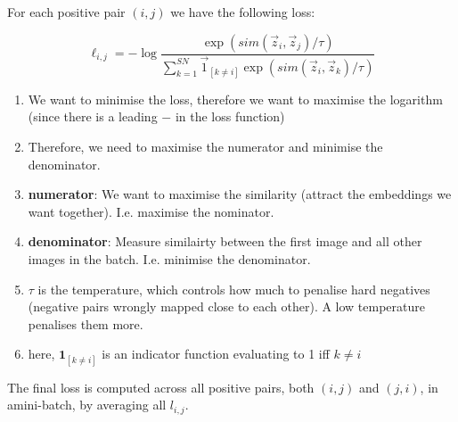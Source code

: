 \documentclass[11pt]{article}
\begin{document}
For each positive pair $(i,j)$ we have the following loss:

\begin{equation}
    \ell_{i,j} = - \log \frac{\exp(sim(\vec z_i, \vec z_j)/\tau)}{\sum^{SN}_{k=1} \vec 1_{[k\neq i]} \exp(sim(\vec z_i, \vec z_k)/\tau)} 
\end{equation}

\begin{enumerate}
    \item We want to minimise the loss, therefore we want to maximise the logarithm (since there is a leading $-$ in the loss function)
    \item Therefore, we need to maximise the numerator and minimise the denominator.
    \item \textbf{numerator}: We want to maximise the similarity (attract the embeddings we want together). I.e. maximise the nominator.
    \item \textbf{denominator}: Measure similairty between the first image and all other images in the batch. I.e. minimise the denominator.
    \item $\tau$ is the temperature, which controls how much to penalise hard negatives (negative pairs wrongly mapped close to each other). A low temperature penalises them more.
    \item here, $\textbf{1}_{[k\neq i]}$ is an indicator function evaluating to
    1 iff $k \neq i$ 
\end{enumerate}

The final loss is computed across all positive pairs, both $(i,j)$ and $(j,i)$, in amini-batch, by averaging all $l_{i,j}$.

\begin{figure}[H]
    \centering
\end{figure}
\end{document}
